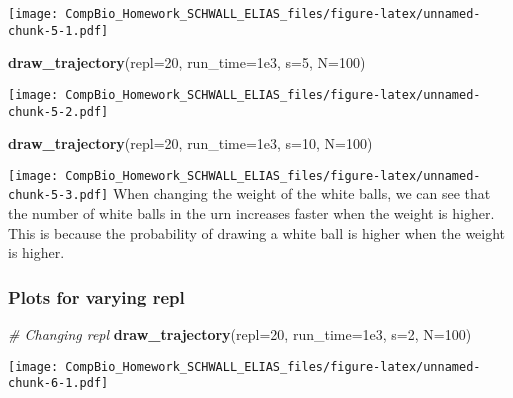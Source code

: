 \documentclass[
]{article}
\newenvironment{Shaded}{\begin{snugshade}}{\end{snugshade}}
\newcommand{\AttributeTok}[1]{\textcolor[rgb]{0.13,0.29,0.53}{#1}}
\newcommand{\CommentTok}[1]{\textcolor[rgb]{0.56,0.35,0.01}{\textit{#1}}}
\newcommand{\DecValTok}[1]{\textcolor[rgb]{0.00,0.00,0.81}{#1}}
\newcommand{\FloatTok}[1]{\textcolor[rgb]{0.00,0.00,0.81}{#1}}
\newcommand{\FunctionTok}[1]{\textcolor[rgb]{0.13,0.29,0.53}{\textbf{#1}}}
\newcommand{\NormalTok}[1]{#1}
\begin{document}
\texttt{[image: CompBio\_Homework\_SCHWALL\_ELIAS\_files/figure-latex/unnamed-chunk-5-1.pdf]}

\begin{Shaded}
\begin{Highlighting}[]
\FunctionTok{draw\_trajectory}\NormalTok{(}\AttributeTok{repl=}\DecValTok{20}\NormalTok{, }\AttributeTok{run\_time=}\FloatTok{1e3}\NormalTok{, }\AttributeTok{s=}\DecValTok{5}\NormalTok{, }\AttributeTok{N=}\DecValTok{100}\NormalTok{)}
\end{Highlighting}
\end{Shaded}

\texttt{[image: CompBio\_Homework\_SCHWALL\_ELIAS\_files/figure-latex/unnamed-chunk-5-2.pdf]}

\begin{Shaded}
\begin{Highlighting}[]
\FunctionTok{draw\_trajectory}\NormalTok{(}\AttributeTok{repl=}\DecValTok{20}\NormalTok{, }\AttributeTok{run\_time=}\FloatTok{1e3}\NormalTok{, }\AttributeTok{s=}\DecValTok{10}\NormalTok{, }\AttributeTok{N=}\DecValTok{100}\NormalTok{)}
\end{Highlighting}
\end{Shaded}

\texttt{[image: CompBio\_Homework\_SCHWALL\_ELIAS\_files/figure-latex/unnamed-chunk-5-3.pdf]}
When changing the weight of the white balls, we can see that the number
of white balls in the urn increases faster when the weight is higher.
This is because the probability of drawing a white ball is higher when
the weight is higher. \newpage

\hypertarget{plots-for-varying-repl}{%
\subsubsection{Plots for varying repl}\label{plots-for-varying-repl}}

\begin{Shaded}
\begin{Highlighting}[]
\CommentTok{\# Changing repl}
\FunctionTok{draw\_trajectory}\NormalTok{(}\AttributeTok{repl=}\DecValTok{20}\NormalTok{, }\AttributeTok{run\_time=}\FloatTok{1e3}\NormalTok{, }\AttributeTok{s=}\DecValTok{2}\NormalTok{, }\AttributeTok{N=}\DecValTok{100}\NormalTok{)}
\end{Highlighting}
\end{Shaded}

\texttt{[image: CompBio\_Homework\_SCHWALL\_ELIAS\_files/figure-latex/unnamed-chunk-6-1.pdf]}
\end{document}
